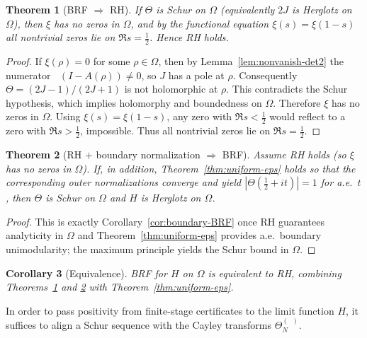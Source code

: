 \documentclass[11pt]{article}
\newtheorem{theorem}{Theorem}
\newtheorem{corollary}[theorem]{Corollary}
\theoremstyle{remark}
\DeclareMathOperator{\dettwo}{det_2}
\begin{document}
\begin{theorem}[BRF $\Rightarrow$ RH]\label{thm:brf-implies-rh}
If $\Theta$ is Schur on $\Omega$ (equivalently $2J$ is Herglotz on $\Omega$), then $\xi$ has no zeros in $\Omega$, and by the functional equation $\xi(s)=\xi(1-s)$ all nontrivial zeros lie on $\Re s=\tfrac12$. Hence RH holds.
\end{theorem}
\begin{proof}
If $\xi(\rho)=0$ for some $\rho\in\Omega$, then by Lemma~\ref{lem:nonvanish-det2} the numerator $\dettwo(I-A(\rho))\ne 0$, so $J$ has a pole at $\rho$. Consequently $\Theta=(2J-1)/(2J+1)$ is not holomorphic at $\rho$. This contradicts the Schur hypothesis, which implies holomorphy and boundedness on $\Omega$. Therefore $\xi$ has no zeros in $\Omega$. Using $\xi(s)=\xi(1-s)$, any zero with $\Re s<\tfrac12$ would reflect to a zero with $\Re s>\tfrac12$, impossible. Thus all nontrivial zeros lie on $\Re s=\tfrac12$.
\end{proof}

\begin{theorem}[RH $+$ boundary normalization $\Rightarrow$ BRF]\label{thm:rh-implies-brf}
Assume RH holds (so $\xi$ has no zeros in $\Omega$). If, in addition, Theorem~\ref{thm:uniform-eps} holds so that the corresponding outer normalizations converge and yield $|\Theta(\tfrac12+it)|=1$ for a.e.~$t$, then $\Theta$ is Schur on $\Omega$ and $H$ is Herglotz on $\Omega$.
\end{theorem}
\begin{proof}
This is exactly Corollary~\ref{cor:boundary-BRF} once RH guarantees analyticity in $\Omega$ and Theorem~\ref{thm:uniform-eps} provides a.e.~boundary unimodularity; the maximum principle yields the Schur bound in $\Omega$.
\end{proof}

\begin{corollary}[Equivalence]
BRF for $H$ on $\Omega$ is equivalent to RH, combining Theorems~\ref{thm:brf-implies-rh} and \ref{thm:rh-implies-brf} with Theorem~\ref{thm:uniform-eps}.
\end{corollary}

In order to pass positivity from finite-stage certificates to the limit function \(H\), it suffices to align a Schur sequence with the Cayley transforms \(\Theta_N^{(\dettwo)}\).
\end{document}
